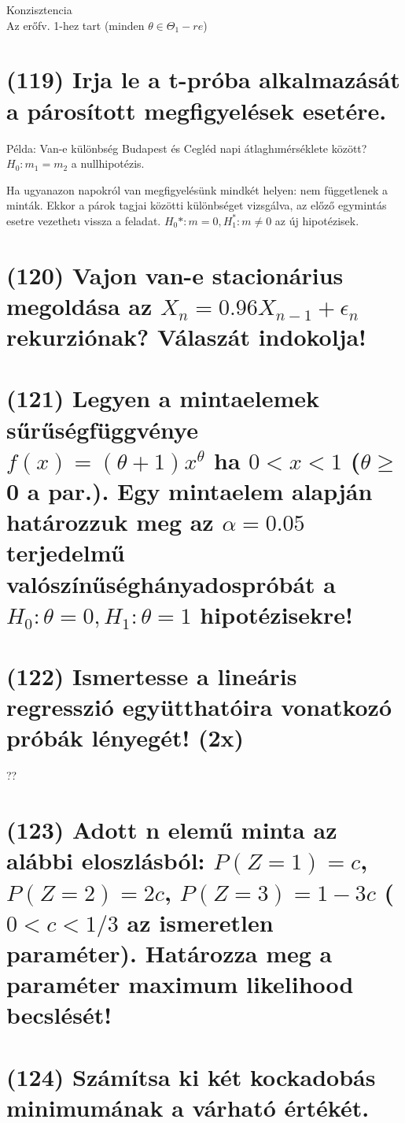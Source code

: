 \documentclass[12p]{article}
\begin{document}
Konzisztencia\\
Az erőfv. 1-hez tart (minden $\theta \in \Theta_1-re$)


\section{(119) Irja le a t-próba alkalmazását a párosított megfigyelések esetére.}

Példa: Van-e különbség Budapest és Cegléd napi átlaghımérséklete között?$H_0: m_1=m_2$ a nullhipotézis. 

Ha ugyanazon napokról van megfigyelésünk
mindkét helyen: nem függetlenek a minták.
Ekkor a párok tagjai közötti különbséget
vizsgálva, az előző egymintás esetre
vezethetı vissza a feladat. $H_0*: m=0 ,H_1^{*}:m\neq0$ az új hipotézisek. 


\section{(120) Vajon van-e stacionárius megoldása az $X_n = 0.96 X_{n-1} + \epsilon_n$ rekurziónak? Válaszát
indokolja!}

\section{(121) Legyen a mintaelemek sűrűségfüggvénye $f(x) = (\theta + 1)x^{\theta}$ ha $0 < x < 1$ ($\theta \geq$ 0 a par.).
Egy mintaelem alapján határozzuk meg az $\alpha = 0.05$ terjedelmű valószínűséghányadospróbát a $H_0 : \theta = 0, H_1 : \theta = 1$ hipotézisekre!}

\section{(122) Ismertesse a lineáris regresszió együtthatóira vonatkozó próbák lényegét! (2x)}

??

\section{(123) Adott n elemű minta az alábbi eloszlásból: $P(Z = 1) = c$, $P(Z = 2) = 2c$, $P(Z = 3) = 1 - 3c$ ($0 < c < 1/3$ az ismeretlen paraméter). Határozza meg a paraméter maximum likelihood becslését!}

\section{(124) Számítsa ki két kockadobás minimumának a várható értékét.}
\end{document}
